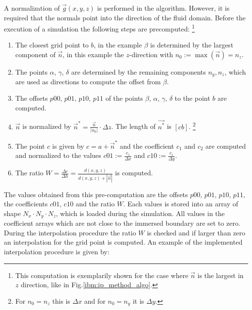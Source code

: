 A normalization of $\vec{g}(x, y, z)$ is performed in the algorithm.
However, it is required that the normals point into the direction of the fluid domain.
Before the execution of a simulation the following steps are precomputed:
\footnote{This computation is exemplarily shown for the case where $\vec{n}$ is the largest in $z$ direction, like in  Fig.\ref{ibm:ip_method_algo}.}


\begin{enumerate}
    \item The closest grid point to $b$, in the example  $\beta$ is determined by the largest component of $\vec{n}$, in this example
          the $z$-direction with $n_0 := \max(\vec{n}) = n_z$.

    \item The points $\alpha$, $\gamma$, $\delta$ are determined by the remaining components ${n_y, n_z}$, which are used as directions to
            compute the offset from $\beta$.

    \item The offsets $p00$, $p01$, $p10$, $p11$ of the points $\beta$, $\alpha$, $\gamma$, $\delta$ to the point $b$ are computed.

    \item $\vec{n}$ is normalized by $\vec{n}^* = \frac{\vec{n}}{|n_0|}\cdot \Delta z$. The length of $\vec{n^*}$ is $[cb]$.
            \footnote{For $n_0=n_z$ this is $\Delta x$ and for $n_0=n_y$ it is $\Delta y$.}

    \item The point $c$ is given by $c = a + \vec{n}^*$ and the coefficient $c_1$ and $c_2$ are computed and normalized to the values
           $c01 := \frac{c_1}{\Delta x}$ and $c10 := \frac{c_1}{\Delta y}$.
    \item The ratio $W=\frac{\Delta c}{\Delta h} = \frac{d(x, y, z)}{d(x, y, z) + |\vec{n}| }$ is computed.
\end{enumerate}

The values obtained from this pre-computation are the offsets  $p00$, $p01$, $p10$, $p11$, the coefficients $c01$, $c10$ and
the ratio $W$. Each values is stored into an array of shape $N_x \cdot N_y \cdot N_z$, which is loaded during the simulation.
All values in the coefficient arrays which are not close to the immersed boundary are set to zero.
During the interpolation procedure the ratio $W$ is checked and if larger than zero an interpolation for the grid point is computed.
An example of the implemented interpolation procedure is given by:

